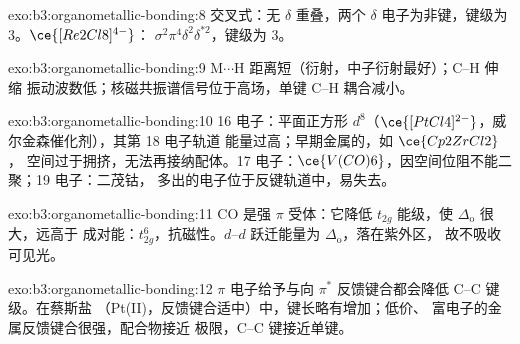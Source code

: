 \begin{solution}{exo:b3:organometallic-bonding:8}
交叉式：无 $\delta$ 重叠，两个 $\delta$ 电子为非键，键级为 3。$\ce{[Re2Cl8]^{4-}}$：
$\sigma^2\pi^4\delta^2\delta^{\ast2}$，键级为 3。
\end{solution}

\begin{solution}{exo:b3:organometallic-bonding:9}
M$\cdots$H 距离短（衍射，中子衍射最好）；C--H 伸缩
振动波数低；核磁共振谱信号位于高场，单键 C--H 耦合减小。
\end{solution}

\begin{solution}{exo:b3:organometallic-bonding:10}
16 电子：平面正方形 $d^8$（$\ce{[PtCl4]^{2-}}$，威尔金森催化剂），其第 18 电子轨道
能量过高；早期金属的，如 $\ce{Cp2ZrCl2}$，
空间过于拥挤，无法再接纳配体。17 电子：$\ce{V(CO)6}$，因空间位阻不能二聚；19 电子：二茂钴，
多出的电子位于反键轨道中，易失去。
\end{solution}

\begin{solution}{exo:b3:organometallic-bonding:11}
CO 是强 $\pi$ 受体：它降低 $t_{2g}$ 能级，使 $\Delta_{\mathrm o}$ 很大，远高于
成对能：$t_{2g}^6$，抗磁性。$d$--$d$ 跃迁能量为 $\Delta_{\mathrm o}$，落在紫外区，
故不吸收可见光。
\end{solution}

\begin{solution}{exo:b3:organometallic-bonding:12}
$\pi$ 电子给予与向 $\pi^*$ 反馈键合都会降低 C--C 键级。在蔡斯盐
（Pt(II)，反馈键合适中）中，键长略有增加；低价、
富电子的金属反馈键合很强，配合物接近
极限，C--C 键接近单键。
\end{solution}

